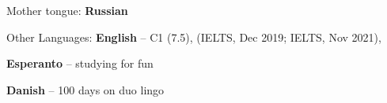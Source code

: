 \documentclass[a4paper, extended]{adcv}
\begin{document}
Mother tongue: \textbf{Russian} 

Other Languages: \textbf{English} -- C1 (7.5), (IELTS, Dec 2019; IELTS, Nov 2021), 

\textbf{Esperanto} -- studying for fun

\textbf{Danish} -- 100 days on duo lingo 


\end{document}

